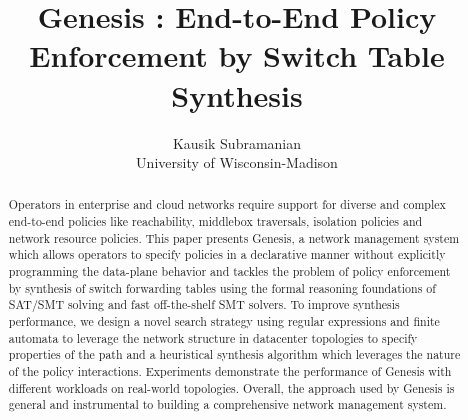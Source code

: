 \documentclass[letterpaper,twocolumn,10pt]{sig-alternate-10pt}
\title{Genesis : End-to-End Policy Enforcement by Switch Table Synthesis }
\author{Kausik Subramanian \\
	University of Wisconsin-Madison}
\begin{document}
\maketitle

\begin{abstract}
Operators in enterprise and cloud networks require support for diverse and complex end-to-end policies like reachability, middlebox traversals, isolation policies and network resource policies. This paper presents Genesis, a network management system which allows operators to specify policies in a declarative manner without explicitly programming the data-plane behavior and tackles the problem of policy enforcement by synthesis of switch forwarding tables using the formal reasoning foundations of SAT/SMT solving and fast off-the-shelf SMT solvers. To improve synthesis performance, we design a novel search strategy using regular expressions and finite automata to leverage the network structure in datacenter topologies to specify properties of the path and a heuristical synthesis algorithm which leverages the nature of the policy interactions. Experiments demonstrate the performance of Genesis with different workloads on real-world topologies. Overall, the approach used by Genesis is general and instrumental to building a comprehensive network management system.

\end{abstract}











{}


\end{document}
